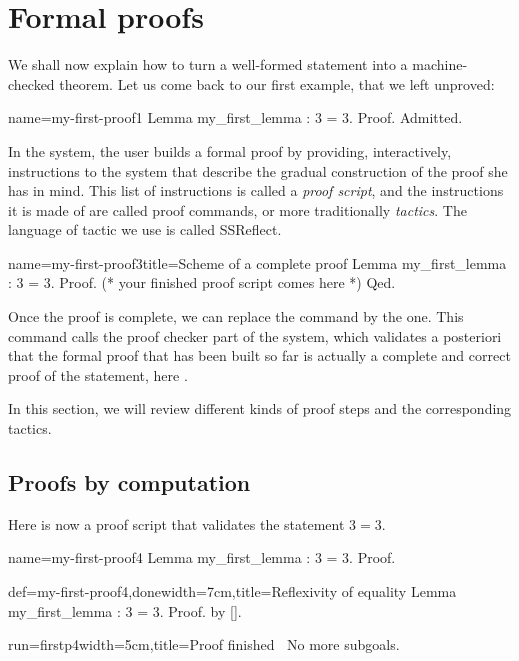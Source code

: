 \section{Formal proofs}

We shall now explain how to turn a well-formed statement into a
machine-checked theorem. Let us come back to our first example, that
we left unproved:
\begin{coq}{name=my-first-proof1}{}
Lemma my_first_lemma : 3 = 3.
Proof.
Admitted.
\end{coq}
In the \Coq{} system, the user builds a formal proof by providing,
interactively, instructions to the \Coq{}
system that describe the gradual construction of the proof she has in
mind. This list of instructions is called a \emph{proof script}, and
the instructions it is made of are called proof commands, or more traditionally
\emph{tactics}.  The language of tactic we use is called
SSReflect.

\begin{coq}{name=my-first-proof3}{title=Scheme of a complete proof}
Lemma my_first_lemma : 3 = 3.
Proof.
(* your finished proof script comes here *)
Qed.
\end{coq}

Once the proof is complete, we can replace the  command by
the  one. This command calls the proof checker part of  the \Coq{}
system, which validates a posteriori that the formal proof that has
been built so far is actually a complete and correct proof of the
statement, here .

In this section, we will review different kinds of proof steps and
the corresponding tactics.

\subsection{Proofs by computation}\label{ssec:proofcomp}

Here is now a proof script that validates the statement $3 = 3$.

\begin{coqdef}{name=my-first-proof4}
Lemma my_first_lemma : 3 = 3.
Proof.
\end{coqdef}
\begin{coq-left}{def=my-first-proof4,done}{width=7cm,title=Reflexivity of equality}
Lemma my_first_lemma : 3 = 3.
Proof. by [].
\end{coq-left}
\begin{coqout-right}{run=firstp4}{width=5cm,title=Proof finished}
$~$
No more subgoals.
\end{coqout-right}

